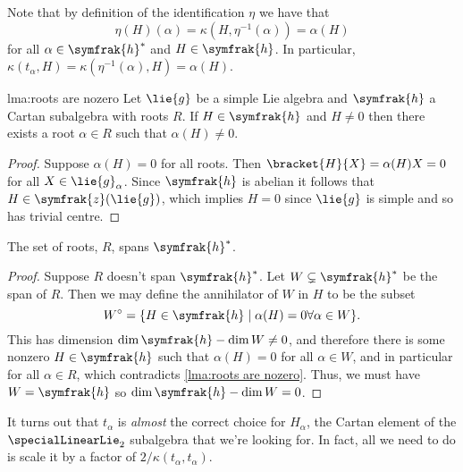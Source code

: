 \documentclass[fleqn]{NotesClass}
\newcommand{\centre}{\symfrak{z}}
\newcommand{\csa}{\symfrak{h}}
\begin{document}
    Note that by definition of the identification \(\eta\) we have that
    \begin{equation}
        \eta(H)(\alpha) = \kappa(H, \eta^{-1}(\alpha)) = \alpha(H)
    \end{equation}
    for all \(\alpha \in \csa^*\) and \(H \in \csa\).
    In particular, \(\kappa(t_\alpha, H) = \kappa(\eta^{-1}(\alpha), H) = \alpha(H)\).
    
    \begin{lma}{}{lma:roots are nozero}
        Let \(\lie{g}\) be a simple Lie algebra and \(\csa\) a Cartan subalgebra with roots \(R\).
        If \(H \in \csa\) and \(H \ne 0\) then there exists a root \(\alpha \in R\) such that \(\alpha(H) \ne 0\).
        \begin{proof}
            Suppose \(\alpha(H) = 0\) for all roots.
            Then \(\bracket{H}{X} = \alpha(H)X = 0\) for all \(X \in \lie{g}_\alpha\).
            Since \(\csa\) is abelian it follows that \(H \in \centre(\lie{g})\), which implies \(H = 0\) since \(\lie{g}\) is simple and so has trivial centre.
        \end{proof}
    \end{lma}
    
    \begin{crl}{}{}
        The set of roots, \(R\), spans \(\csa^*\).
        \begin{proof}
            Suppose \(R\) doesn't span \(\csa^*\).
            Let \(W \subsetneq \csa^*\) be the span of \(R\).
            Then we may define the annihilator of \(W\) in \(H\) to be the subset
            \begin{equation}
                W^\circ = \{H \in \csa \mid \alpha(H) = 0 \forall \alpha \in W\}.
            \end{equation}
            This has dimension \(\dim \csa - \dim W \ne 0\), and therefore there is some nonzero \(H \in \csa\) such that \(\alpha(H) = 0\) for all \(\alpha \in W\), and in particular for all \(\alpha \in R\), which contradicts \cref{lma:roots are nozero}.
            Thus, we must have \(W = \csa\) so \(\dim \csa - \dim W = 0\).
        \end{proof}
    \end{crl}
    
    It turns out that \(t_\alpha\) is \emph{almost} the correct choice for \(H_\alpha\), the Cartan element of the \(\specialLinearLie_2\) subalgebra that we're looking for.
    In fact, all we need to do is scale it by a factor of \(2/\kappa(t_\alpha, t_\alpha)\).
    
\end{document}
